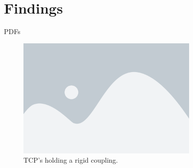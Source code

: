 \section{Findings}

\begin{frame}{PDFs}

    \begin{figure}[h]
        \centering
        \includegraphics[width=0.8\textwidth]{resources/placeholder.png}
        \captionsetup{labelformat=empty}
        \caption{TCP's holding a rigid coupling.}
    \end{figure}
    
\end{frame}

